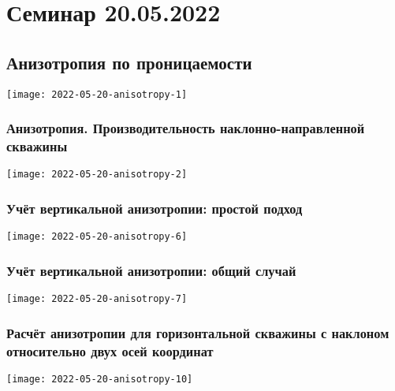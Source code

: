 \documentclass[main.tex]{subfiles}
\begin{document}
\section{Семинар 20.05.2022}

\subsection{Анизотропия по проницаемости}
\texttt{[image: 2022-05-20-anisotropy-1]}

\subsubsection{Анизотропия. Производительность наклонно-направленной скважины}
\texttt{[image: 2022-05-20-anisotropy-2]}




\subsubsection{Учёт вертикальной анизотропии: простой подход}
\texttt{[image: 2022-05-20-anisotropy-6]}

\subsubsection{Учёт вертикальной анизотропии: общий случай}
\texttt{[image: 2022-05-20-anisotropy-7]}



\subsubsection{Расчёт анизотропии для горизонтальной скважины с наклоном относительно двух осей координат}
\texttt{[image: 2022-05-20-anisotropy-10]}


\end{document}
